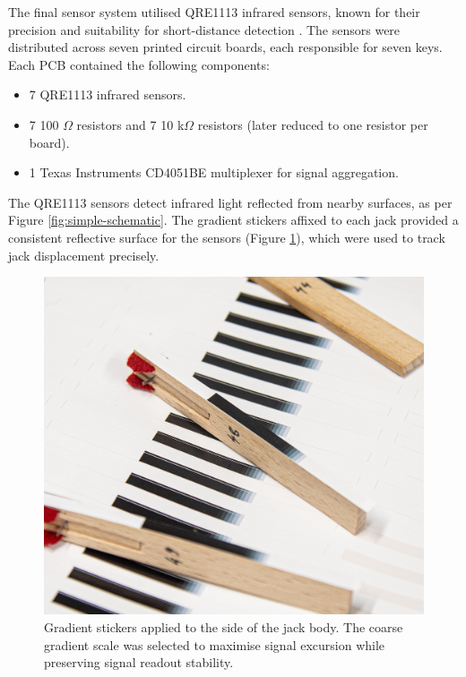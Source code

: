 The final sensor system utilised QRE1113 infrared sensors, known for their precision and suitability for short-distance detection \cite{McPherson2013, McPherson2019}. The sensors were distributed across seven printed circuit boards, each responsible for seven keys. Each PCB contained the following components:

\begin{itemize}
    \item 7 QRE1113 infrared sensors.
    \item 7 100 $\Omega$ resistors and 7 10 k$\Omega$ resistors (later reduced to one resistor per board).
    \item 1 Texas Instruments CD4051BE multiplexer for signal aggregation.
\end{itemize}

The QRE1113 sensors detect infrared light reflected from nearby surfaces, as per Figure \ref{fig:simple-schematic}. The gradient stickers affixed to each jack provided a consistent reflective surface for the sensors (Figure \ref{fig:jack-tags}), which were used to track jack displacement precisely. 

\begin{figure}[b]  
  \centering
  \includegraphics[width=\linewidth]{src/images/tagging-jacks-3.jpg} 
  \caption{Gradient stickers applied to the side of the jack body. The coarse gradient scale was selected to maximise signal excursion while preserving signal readout stability.}
  \Description{} 
  \label{fig:jack-tags}
\end{figure}

